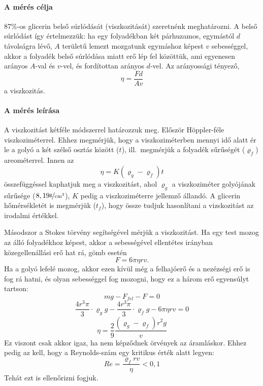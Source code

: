 \documentclass[12pt]{article}
\begin{document}
\def\rhog{\ensuremath{\rho_{g}}}\def\rhof{\ensuremath{\rho_{f}}}\def\rhov{\ensuremath{\rho_{v}}}\def\rho{\ensuremath{\varrho}}\def\dx{\ensuremath{d_x}}\def\dy{\ensuremath{d_y}}\def\dz{\ensuremath{d_z}}\def\mui{\ensuremath{\mu_1}}\def\muii{\ensuremath{\mu_2}}\def\muiii{\ensuremath{\mu_3}}\def\muiv{\ensuremath{\mu_4}}\def\tf{\ensuremath{t_f}}\def\Re{\ensuremath{Re}}\def\Deltaeta{\ensuremath{\Delta\eta}}
\paragraph{A mérés célja}
87\%-os glicerin belső súrlódását (viszkozitását) szeretnénk meghatározni.  A belső súrlódást így értelmezzük: ha egy folyadékban két párhuzamos, egymástól $d$ távolságra lévő, $A$ területű lemezt mozgatunk egymáshoz képest $v$ sebességgel, akkor a folyadék belső súrlódása miatt erő lép fel közöttük, ami egyenesen arányos $A$-val és $v$-vel, és fordítottan arányos $d$-vel. Az arányossági tényező, \[\eta = \frac{Fd}{Av} \] a viszkozitás.

\paragraph{A mérés leírása}
A viszkozitást kétféle módszerrel határozzuk meg. Először Höppler-féle viszkozi\-méterrel. Ehhez megmérjük, hogy a viszkoziméterben mennyi idő alatt ér le a golyó a két szélső osztás között ($t$), ill.\ megmérjük a folyadék sűrűségét ($\rhof$) areométerrel. Innen az \[\eta = K(\rhog-\rhof)t\] összefüggéssel kaphatjuk meg a viszkozitást, ahol $\rhog$ a viszkoziméter golyójának sűrűsége ($8,19\unitfrac{g}{cm^3}$), $K$ pedig a viszkoziméterre jellemző állandó. A glicerin hőmérsékletét is megmérjük ($\tf$), hogy össze tudjuk hasonlítani a vizskozitást az irodalmi értékkel.

Másodszor a Stokes törvény segítségével mérjük a viszkozitást.
Ha egy test mozog az álló folyadékhoz képest, akkor a sebességével ellentétes irányban közegellenállási erő hat rá, gömb esetén \[F=6\pi \eta r v.\]
Ha a golyó lefelé mozog, akkor ezen kívül még a felhajóerő és a nezézségi erő is fog rá hatni, és olyan sebességgel fog mozogni, hogy ez a három erő egyensúlyt tartson: \[mg - F_{fel} - F = 0\] \[ \frac{4r^3\pi}{3}\cdot \rhog g - \frac{4r^3\pi}{3} \cdot \rhof g - 6\pi \eta r v = 0\] 
\[\eta = \frac29 \frac{(\rhog - \rhof) r^2 g}{v}\]
Ez viszont csak akkor igaz, ha nem képződnek örvények az áramláskor. Ehhez pedig az kell, hogy a Reynolds-szám egy kritikus érték alatt legyen: \[\Re = \frac{\rhof r v}{\eta} < 0,1 \]
Tehát ezt is ellenőrizni fogjuk.
\end{document}
